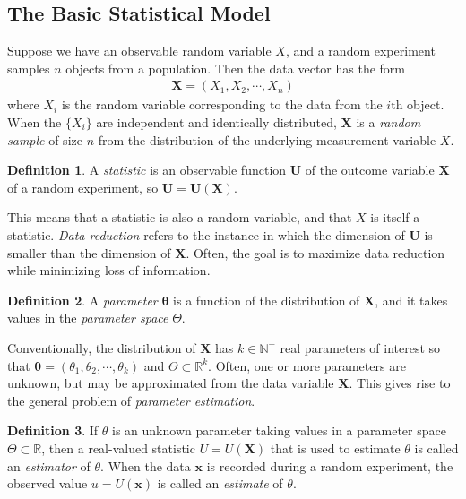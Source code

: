 \documentclass[a4paper,12pt]{article}
\theoremstyle{definition}
\theoremstyle{definition}
\theoremstyle{definition}
\newtheorem{definition}{Definition}[section]
\newcommand{\bs}{\boldsymbol}
\begin{document}
    \subsection*{The Basic Statistical Model}
    Suppose we have an observable random variable $X$, and a random experiment samples $n$ objects from a population. Then the data vector has the form
    \begin{align*}
        \bs{X} = (X_1, X_2, \cdots, X_n)
    \end{align*}
    where $X_i$ is the random variable corresponding to the data from the $i$th object. When the $\{ X_i \}$ are independent and identically distributed, $\bs{X}$ is a \textit{random sample} of size $n$ from the distribution of the underlying measurement variable $X$. \par
    \begin{definition}
        A \textit{statistic} is an observable function $\bs{U}$ of the outcome variable $\bs{X}$ of a random experiment, so $\bs{U} = \bs{U}(\bs{X})$.
    \end{definition}
    This means that a statistic is also a random variable, and that $X$ is itself a statistic. \textit{Data reduction} refers to the instance in which the dimension of $\bs{U}$ is smaller than the dimension of $\bs{X}$. Often, the goal is to maximize data reduction while minimizing loss of information. \par
    \begin{definition}
    A \textit{parameter} $\bs{\theta}$ is a function of the distribution of $\bs{X}$, and it takes values in the \textit{parameter space} $\Theta$.
    \end{definition}
    Conventionally, the distribution of $\bs{X}$ has $k \in \mathbb{N}^+$ real parameters of interest so that $\bs{\theta} = (\theta_1, \theta_2, \cdots, \theta_k)$ and $\Theta \subset \mathbb{R}^k$. Often, one or more parameters are unknown, but may be approximated from the data variable $\bs{X}$. This gives rise to the general problem of \textit{parameter estimation}. \par
    \begin{definition}
        If $\theta$ is an unknown parameter taking values in a parameter space $\Theta \subset \mathbb{R}$, then a real-valued statistic $U = U(\bs{X})$ that is used to estimate $\theta$ is called an \textit{estimator} of $\theta$. When the data $\bs{x}$ is recorded during a random experiment, the observed value $u = U(\bs{x})$ is called an \textit{estimate} of $\theta$.
    \end{definition}
\end{document}
